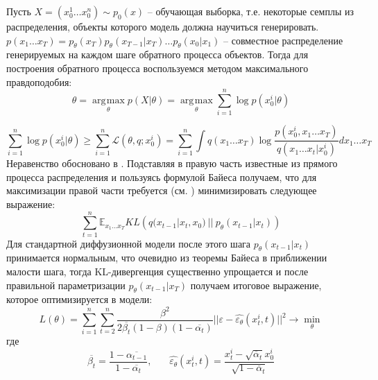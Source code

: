 \documentclass{article}
\DeclareMathOperator*{\argmax}{\arg\!\max}
\begin{document}
Пусть $X = (x_0^1\dots x_0^n)\sim p_0(x)$ -- обучающая выборка, т.е. некоторые семплы из распределения, объекты которого модель должна научиться генерировать. $p(x_1\dots x_T) = p_\theta(x_T)p_\theta(x_{T-1}|x_T)\dots p_\theta(x_0|x_1)$ -- совместное распределение генерируемых на каждом шаге обратного процесса объектов. Тогда для построения обратного процесса воспользуемся методом максимального правдоподобия:
 \begin{equation}
	\theta =\argmax\limits_{\theta} p(X|\theta) = \argmax\limits_{\theta} \sum\limits_{i=1}^n \log{p(x_0^i|\theta)}
\end{equation}

 \begin{equation}	
	 \sum\limits_{i=1}^n \log{p(x_0^i|\theta)}\geqslant \sum\limits_{i=1}^n \mathcal{L}(\theta, q;x^i_0) = \sum\limits_{i=1}^n\int q(x_1\dots x_T)\log{ \frac{p(x_0^i,x_1\dots x_T)}{q(x_1\dots x_t|x_0^i)}}dx_1\dots x_T
\end{equation}
 Неравенство обосновано в \cite{https://doi.org/10.48550/arxiv.1312.6114}. Подставляя в правую часть известные из прямого процесса распределения и пользуясь формулой Байеса получаем, что для максимизации правой части требуется (см. \cite{https://doi.org/10.48550/arxiv.2006.11239}) минимизировать следующее выражение:
 \begin{equation}
 	 	\label{KL_loss}
	\sum\limits_{t=1}^n \mathbb{E}_{x_1\dots x_T} KL\left(q(x_{t-1}|x_t, x_0)~||~p_\theta(x_{t-1}|x_t)  \right)
\end{equation}
Для стандартной диффузионной модели после этого шага $p_\theta(x_{t-1}|x_t)$ принимается нормальным, что очевидно из теоремы Байеса в приближении малости шага, тогда KL-дивергенция существенно упрощается и после правильной параметризации $p_\theta(x_{t-1}|x_T)$ получаем итоговое выражение, которое оптимизируется в модели:
 \begin{equation}
	L(\theta) =  \sum\limits_{i=1}^n \sum\limits_{t=2}^n \frac{\beta^2}{2\overline{\beta_t} (1-\beta)(1-\overline{\alpha_t})} ||\varepsilon - \widehat{\varepsilon_\theta}(x_t^i, t)||^2\longrightarrow\min\limits_\theta
\end{equation}
где 
 \begin{equation*}
	\overline{\beta_t} = \frac{1-\overline{\alpha_{t-1}}}{1 - \overline{\alpha_t}}, ~~~~~~~~ \widehat{\varepsilon_\theta}(x_t^i, t) = \frac{x_t^i - \sqrt{\overline\alpha_t} x_0^i}{\sqrt{1-\overline\alpha_t}}
\end{equation*}
\end{document}
